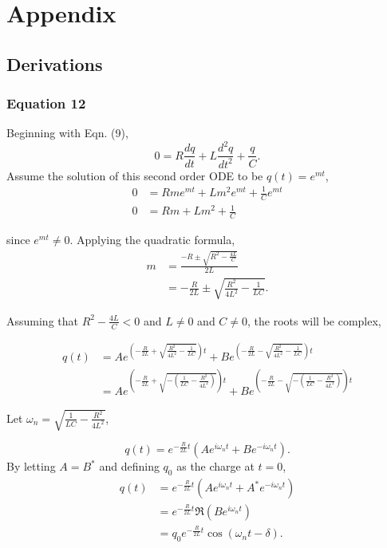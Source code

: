 \documentclass{article}
\begin{document}
\section{Appendix}
\subsection{Derivations}
\subsubsection{Equation 12} \label{d1}
Beginning with Eqn. (9),
\begin{equation}
    0 = R\frac{dq}{dt}+L\frac{d^2q}{dt^2}+\frac{q}{C}.
\end{equation}
Assume the solution of this second order ODE to be $q(t)=e^{mt}$,
\begin{equation}
    \begin{split}
    0 &= Rme^{mt} + Lm^2e^{mt} + \frac{1}{C}e^{mt} \\
    0 &= Rm + Lm^2 + \frac{1}{C}  
    \end{split}
\end{equation}

since $e^{mt}\neq 0$. Applying the quadratic formula,
\begin{equation}
    \begin{split}
        m&=\frac{-R\pm\sqrt{R^2-\frac{4L}{C}}}{2L} \\
        &=-\frac{R}{2L}\pm\sqrt{\frac{R^2}{4L^2}-\frac{1}{LC}}.
    \end{split}
\end{equation}

Assuming that $R^2-\frac{4L}{C} < 0$ and $L\neq0$ and $C\neq0$, 
the roots will be complex,

\begin{equation}
    \begin{split}
    q(t)&=Ae^{(-\frac{R}{2L}+\sqrt{\frac{R^2}{4L^2}-\frac{1}{LC}})t} 
    + Be^{(-\frac{R}{2L}-\sqrt{\frac{R^2}{4L^2}-\frac{1}{LC}})t} \\
    &=Ae^{\left(-\frac{R}{2L}+\sqrt{-\left(\frac{1}{LC} - 
    \frac{R^2}{4L^2}\right)}\right)t} + Be^{\left(-\frac{R}{2L}-
    \sqrt{-\left(\frac{1}{LC}-
    \frac{R^2}{4L^2}\right)}\right)t}      
    \end{split}    
\end{equation}

Let $\omega_n = \sqrt{\frac{1}{LC}-\frac{R^2}{4L^2}}$,

\begin{equation}
    q(t)=e^{-\frac{R}{2L}t}(Ae^{i\omega_nt}+Be^{-i\omega_nt}).
\end{equation}  
By letting $A = B^{*}$ and defining $q_0$ as the charge at $t=0$,
\begin{equation}
    \begin{split}
    q(t)&=e^{-\frac{R}{2L}t}(Ae^{i\omega_nt}+A^{*}e^{-i\omega_nt}) \\
    &= e^{-\frac{R}{2L}t}\Re(Be^{i\omega_nt}) \\
    &= q_0e^{-\frac{R}{2L}t}\cos{\left(\omega_nt - \delta\right)}.
    \end{split}
\end{equation}
\end{document}
